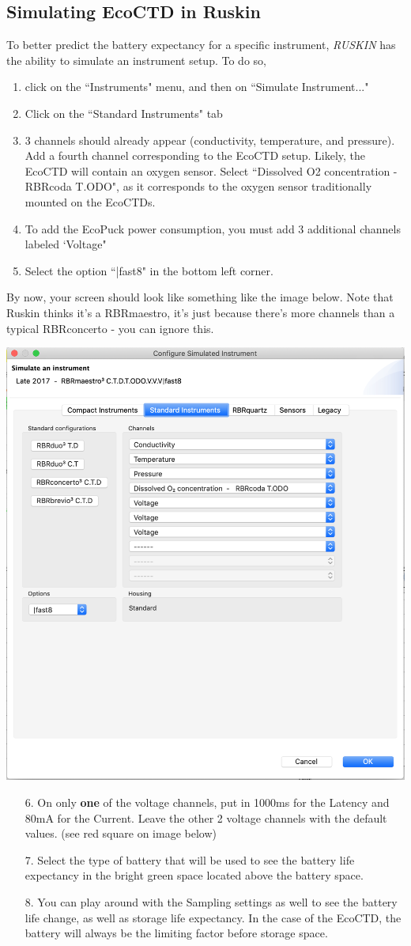 \documentclass[13pt]{article}
\newcommand{\ruskin}{\textit{RUSKIN }}
\begin{document}
\subsection{Simulating EcoCTD in Ruskin}
To better predict the battery expectancy for a specific instrument, \ruskin has the ability to simulate an instrument setup. To do so, 
\begin{enumerate}
    \item click on the ``Instruments" menu, and then on ``Simulate Instrument..."
    \item Click on the ``Standard Instruments" tab
    \item 3 channels should already appear (conductivity, temperature, and pressure). Add a fourth channel corresponding to the EcoCTD setup. Likely, the EcoCTD will contain an oxygen sensor. Select ``Dissolved O2 concentration - RBRcoda T.ODO", as it corresponds to the oxygen sensor traditionally mounted on the EcoCTDs.
    \item To add the EcoPuck power consumption, you must add 3 additional channels labeled `Voltage"
    \item Select the option ``|fast8" in the bottom left corner. 
\end{enumerate}
By now, your screen should look like something like the image below. Note that Ruskin thinks it's a RBRmaestro, it's just because there's more channels than a typical RBRconcerto - you can ignore this.

\begin{center}
    \includegraphics[width = .5\linewidth]{EcocTD_simulation.png}
\end{center}

\begin{enumerate}
    \item[6.]  On only \textbf{one} of the voltage channels, put in 1000ms for the Latency and 80mA for the Current. Leave the other 2 voltage channels with the default values. (see red square on image below)
    \item[7.] Select the type of battery that will be used to see the battery life expectancy in the bright green space located above the battery space.
    \item[8.] You can play around with the Sampling settings as well to see the battery life change, as well as storage life expectancy. In the case of the EcoCTD, the battery will always be the limiting factor before storage space.
\end{enumerate}
\end{document}
